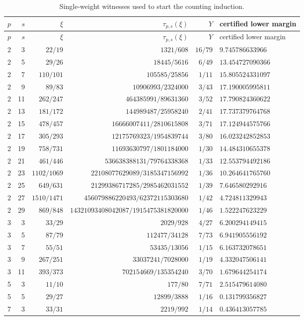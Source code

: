 \documentclass[11pt]{article}
\theoremstyle{definition}
\theoremstyle{remark}
\begin{document}
\begingroup\small
\begin{longtable}{@{}rrrrrl@{}}
\caption{Single-weight witnesses used to start the counting induction.}
\label{tab:individual}\\
\toprule
$p$&$s$&$\xi$&$\tau_{p,s}(\xi)$&$Y$&certified lower margin\\
\midrule
\endfirsthead
\toprule
$p$&$s$&$\xi$&$\tau_{p,s}(\xi)$&$Y$&certified lower margin\\
\midrule
\endhead
2&3&$22/19$&$1321/608$&$16/79$&$9.745786633966$\\
2&5&$29/26$&$18445/5616$&$6/49$&$13.454727090366$\\
2&7&$110/101$&$105585/25856$&$1/11$&$15.805524331097$\\
2&9&$89/83$&$10906993/2324000$&$3/43$&$17.190005995811$\\
2&11&$262/247$&$464385991/89631360$&$3/52$&$17.790824360622$\\
2&13&$181/172$&$144989487/25958240$&$2/41$&$17.737379764768$\\
2&15&$478/457$&$16666007411/2810615808$&$3/71$&$17.124944575766$\\
2&17&$305/293$&$12175769323/1954839744$&$3/80$&$16.023242852853$\\
2&19&$758/731$&$11693630797/1801184000$&$1/30$&$14.484310655378$\\
2&21&$461/446$&$536638388131/79764338368$&$1/33$&$12.553794492186$\\
2&23&$1102/1069$&$22108077629089/3185347156992$&$1/36$&$10.264641765760$\\
2&25&$649/631$&$21299386717285/2985462031552$&$1/39$&$7.646580292916$\\
2&27&$1510/1471$&$456079886220493/62372115303680$&$1/42$&$4.724811329943$\\
2&29&$869/848$&$14321093408042087/1915475381820000$&$1/46$&$1.522247623229$\\
3&3&$33/29$&$2029/928$&$4/27$&$6.200294149415$\\
3&5&$87/79$&$112477/34128$&$7/73$&$6.941905556192$\\
3&7&$55/51$&$53435/13056$&$1/15$&$6.163732078651$\\
3&9&$267/251$&$33037241/7028000$&$1/19$&$4.332047506141$\\
3&11&$393/373$&$702154669/135354240$&$3/70$&$1.679644254174$\\
5&3&$11/10$&$177/80$&$7/71$&$2.515479614080$\\
5&5&$29/27$&$12899/3888$&$1/16$&$0.131799356827$\\
7&3&$33/31$&$2219/992$&$1/14$&$0.436413057785$\\
\bottomrule
\end{longtable}
\endgroup
\end{document}
